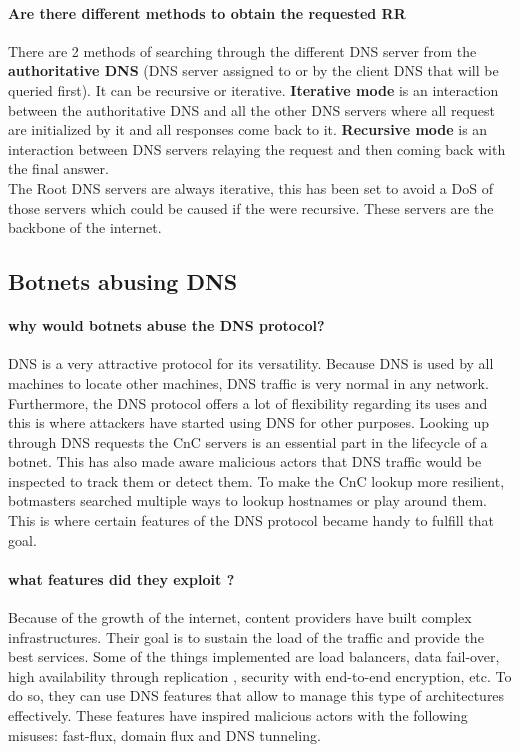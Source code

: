 \paragraph{Are there different methods to obtain the requested RR}
There are 2 methods of searching through the different DNS server from the \textbf{authoritative DNS} (DNS server assigned to or by the client DNS that will be queried first). It can be recursive or iterative. \textbf{Iterative mode} is an interaction between the authoritative DNS and all the other DNS servers where all request are initialized by it and all responses come back to it. \textbf{Recursive mode} is an interaction between DNS servers relaying the request and then coming back with the final answer. \\The Root DNS servers are always iterative, this has been set to avoid a DoS of those servers which could be caused if the were recursive. These servers are the backbone of the internet.

\subsection{Botnets abusing DNS}

\paragraph{why would botnets abuse the DNS protocol?}
DNS is a very attractive protocol for its versatility. Because DNS is used by all machines to locate other machines, DNS traffic is very normal in any network. Furthermore, the DNS protocol offers a lot of flexibility regarding its uses and this is where attackers have started using DNS for other purposes.
Looking up through DNS requests the CnC servers is an essential part in the lifecycle of a botnet. This has also made aware malicious actors that DNS traffic would be inspected to track them or detect them. To make the CnC lookup more resilient, botmasters searched multiple ways to lookup hostnames or play around them. This is where certain features of the DNS protocol became handy to fulfill that goal.
\paragraph{what features did they exploit ?}
Because of the growth of the internet, content providers have built complex infrastructures. Their goal is to sustain the load of the traffic and provide the best services. Some of the things implemented are load balancers, data fail-over, high availability through replication , security with end-to-end encryption, etc. To do so, they can use DNS features that allow to manage this type of architectures effectively. These features have inspired malicious actors with the following misuses: fast-flux, domain flux and DNS tunneling.

